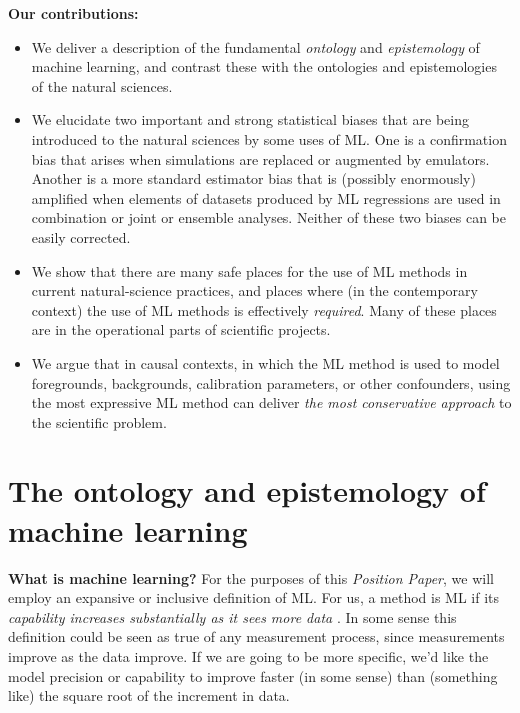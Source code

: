 \documentclass{article}
\newcommand{\documentname}{\textsl{Position Paper}}
\renewcommand{\paragraph}[1]{\noindent\par\textbf{#1}}
\begin{document}
\paragraph{Our contributions:}
\begin{itemize}
  \item We deliver a description of the fundamental \emph{ontology} and \emph{epistemology} of machine learning, and contrast these with the ontologies and epistemologies of the natural sciences.
  \item We elucidate two important and strong statistical biases that are being introduced to the natural sciences by some uses of ML. One is a confirmation bias that arises when simulations are replaced or augmented by emulators. Another is a more standard estimator bias that is (possibly enormously) amplified when elements of datasets produced by ML regressions are used in combination or joint or ensemble analyses. Neither of these two biases can be easily corrected.
  \item We show that there are many safe places for the use of ML methods in current natural-science practices, and places where (in the contemporary context) the use of ML methods is effectively \emph{required}. Many of these places are in the operational parts of scientific projects.
  \item We argue that in causal contexts, in which the ML method is used to model foregrounds, backgrounds, calibration parameters, or other confounders, using the most expressive ML method can deliver \emph{the most conservative approach} to the scientific problem.
\end{itemize}

\section{The ontology and epistemology of machine learning}\label{sec:philosophy}

\paragraph{What is machine learning?}
For the purposes of this \documentname, we will employ an expansive or inclusive definition of ML.
For us, a method is ML if its \emph{capability increases substantially as it sees more data} \cite{ml_definition}.
In some sense this definition could be seen as true of any measurement process, since measurements improve as the data improve. 
If we are going to be more specific, we'd like the model precision or capability to improve faster (in some sense) than (something like) the square root of the increment in data.
\end{document}
